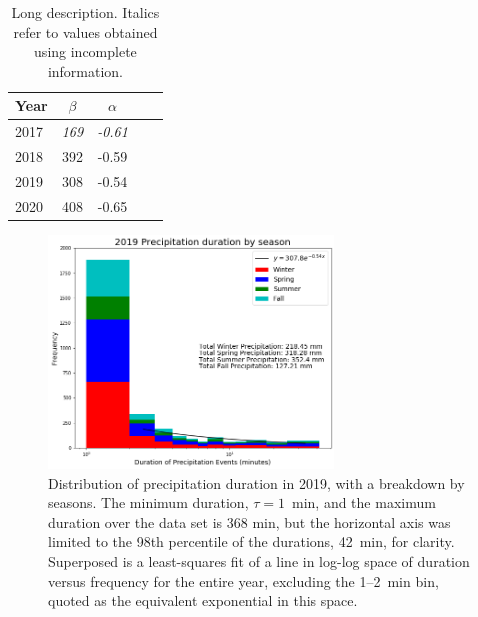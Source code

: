 \documentclass[11pt]{report}
\begin{document}
\begin{table}[b]
	\begin{center}
		\begin{tabular}{l*{3}{c}r}
			\centering
			Year      & $\beta $ & $\alpha$  \\
			\hline
			2017      & \textit{169}           & \textit{-0.61}   \\
			2018      & 392           & -0.59    \\
			2019      & 308           & -0.54   \\
			2020      & 408           & -0.65    \\
		\end{tabular}
	\end{center}
	\caption[Short title]{Long description. Italics refer to values
		obtained using incomplete information. }
\end{table}
\begin{figure}[t]
  \centering
  \includegraphics[width=0.675\textwidth]{Figures/More_detail_precip_2019.png}
  \caption[Precipitation histogram for 2019 broken down by
    season]{\label{p2019} Distribution of precipitation duration in
    2019, with a breakdown by seasons. The minimum duration,
    $\tau=1$~min, and the maximum duration over the data set is 368
    min, but the horizontal axis was limited to the 98th percentile of
    the durations, 42~min, for clarity. Superposed is a least-squares
    fit of a line in log-log space of duration versus frequency for
    the entire year, excluding the 1--2~min bin, quoted as the
    equivalent exponential in this space.}
\end{figure}
\end{document}

